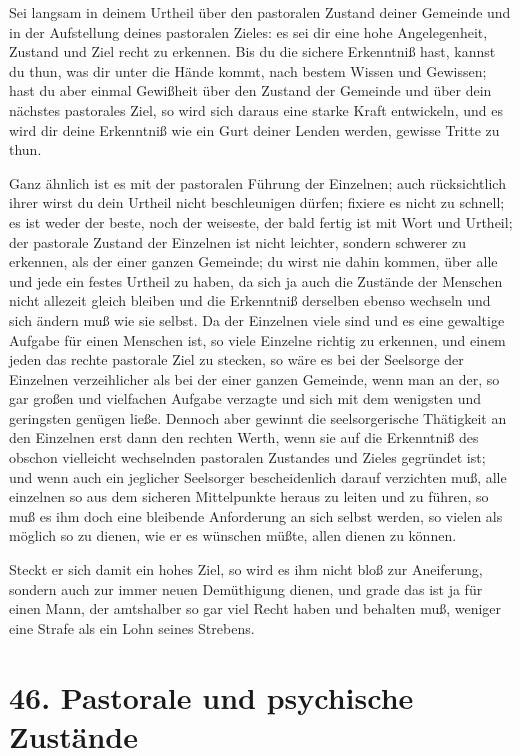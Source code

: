 Sei langsam in deinem Urtheil über den pastoralen Zustand deiner Gemeinde und in der Aufstellung deines pastoralen Zieles: es sei dir eine hohe Angelegenheit, Zustand und Ziel recht zu erkennen. Bis du die sichere Erkenntniß hast,
kannst du thun, was dir unter die Hände kommt, nach bestem Wissen und Gewissen; hast du aber einmal Gewißheit über den Zustand der Gemeinde und über dein nächstes pastorales Ziel, so wird sich daraus eine starke Kraft entwickeln, und es wird dir deine Erkenntniß wie ein Gurt deiner Lenden werden, gewisse Tritte zu thun.

Ganz ähnlich ist es mit der pastoralen Führung der Einzelnen; auch rücksichtlich ihrer wirst du dein Urtheil nicht beschleunigen dürfen; fixiere es nicht zu schnell; es ist weder der beste, noch der weiseste, der bald fertig ist mit Wort und Urtheil; der pastorale Zustand der Einzelnen ist nicht leichter, sondern schwerer zu erkennen, als der einer ganzen Gemeinde; du wirst nie dahin kommen, über alle und jede ein festes Urtheil zu haben, da sich ja auch die Zustände der Menschen nicht allezeit gleich bleiben und die Erkenntniß derselben ebenso wechseln und sich ändern muß wie sie selbst. Da der Einzelnen viele sind und es eine gewaltige Aufgabe für einen Menschen ist, so viele Einzelne richtig zu erkennen, und einem jeden das rechte pastorale Ziel zu stecken, so wäre es bei der Seelsorge der Einzelnen verzeihlicher als bei der einer ganzen Gemeinde, wenn man an der, so gar großen und vielfachen Aufgabe verzagte und sich mit dem wenigsten und geringsten genügen ließe. Dennoch aber gewinnt die seelsorgerische Thätigkeit an den Einzelnen erst dann den rechten Werth, wenn sie auf die Erkenntniß des obschon vielleicht wechselnden pastoralen Zustandes und Zieles gegründet ist; und wenn auch ein jeglicher Seelsorger bescheidenlich darauf verzichten muß, alle
einzelnen so aus dem sicheren Mittelpunkte heraus zu leiten und zu führen, so muß es ihm doch eine bleibende Anforderung an sich selbst werden, so vielen als möglich so zu dienen, wie er es wünschen müßte, allen dienen zu können.

Steckt er sich damit ein hohes Ziel, so wird es ihm nicht bloß zur Aneiferung, sondern auch zur immer neuen Demüthigung dienen, und grade das ist ja für einen Mann, der amtshalber so gar viel Recht haben und behalten muß, weniger eine Strafe als ein Lohn seines Strebens.

\section{46. Pastorale und psychische Zustände}

